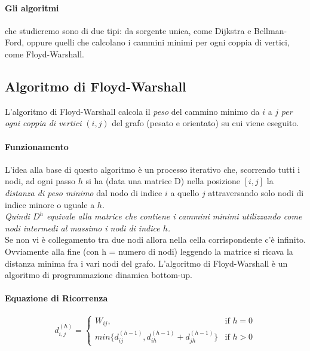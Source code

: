 \documentclass[12pt, a4paper, openany]{book}
\begin{document}
\paragraph*{Gli algoritmi} che studieremo sono di due tipi: da sorgente unica, come Dijkstra e Bellman-Ford, oppure quelli che calcolano i cammini minimi per ogni coppia di vertici, come Floyd-Warshall.
\subsection{Algoritmo di Floyd-Warshall}
L'algoritmo di Floyd-Warshall calcola il \emph{peso} del cammino minimo da $i$ a $j$ \emph{per ogni coppia di vertici} $(i,j)$ del grafo (pesato e orientato) su cui viene eseguito.

\paragraph{Funzionamento}
L'idea alla base di questo algoritmo è un processo iterativo che, scorrendo tutti i nodi, ad ogni passo $h$ si ha
(data una matrice D) nella posizione $[i,j]$ la \emph{distanza di peso minimo} dal nodo di indice $i$ a quello $j$ attraversando solo nodi di indice minore o uguale a $h$.\\
\textit{Quindi $D^h$ equivale alla matrice che contiene i cammini minimi utilizzando come nodi intermedi al massimo i nodi di indice $h$.}
\\Se non vi è collegamento tra due nodi allora nella cella corrispondente c'è infinito.
Ovviamente alla fine (con h = numero di nodi) leggendo la matrice si ricava la distanza minima fra i vari nodi del grafo.
L'algoritmo di Floyd-Warshall è un algoritmo di programmazione dinamica bottom-up.

\paragraph{Equazione di Ricorrenza}

\begin{equation*}
	d^{(h)}_{i,j}= \begin{cases}
		W_{ij},                                                & \text{if $h = 0$} \\
		min\{ d^{(h-1)}_{ij},d^{(h-1)}_{ih} + d^{(h-1)}_{jh}\} & \text{if $h > 0$}
	\end{cases}
\end{equation*}
\end{document}
